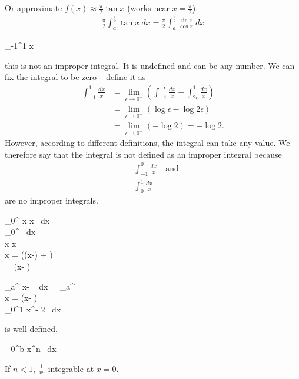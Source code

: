 \begin{nex}
 	Or approximate $f(x) \approx \frac \pi 2 \tan x$ (works near $x=\frac \pi 2$).
 	\begin{align*}
 	\frac \pi 2 \int_a^{\frac \pi 2} \tan x ~dx = \frac \pi 2 \int_a^{\frac \pi 2} \frac{\sin x}{\cos x} ~ dx
 	\end{align*}
 	\item
 	\begin{itemal}
 		\int_{-1}^1  x
 	\end{itemal}
 	this is not an improper integral. It is undefined and can be any number. We can fix the integral to be zero -- define it as
 	\begin{align*}
 	\int_{-1}^1 \frac{dx} x & = \lim_{\epsilon \to 0^+} \left( \int_{-1}^{-\epsilon} \frac{dx} x + \int_{2\epsilon}^1 \frac{dx} x\right) \\
 	& = \lim_{\epsilon \to 0^+} (\log \epsilon - \log 2\epsilon) \\
 	& = \lim_{\epsilon\to 0^+} (-\log 2) = -\log 2.
 	\end{align*}
 	However, according to different definitions, the integral can take any value. We therefore say that the integral is not defined as an improper integral because
 	\begin{align*}
 	& \int_{-1}^0 \frac{dx} x \quad \text{and} \\
 	& \int_0^1 \frac{dx} x
 	\end{align*}
 	are no improper integrals. 
 	\item
 	\begin{itemal}
 		\int_0^{\frac {}} \frac x {\cos x} ~dx \\
 		\int_0^{\frac {}}  ~dx \\
 		\frac x {\cos x}  \infty \\
 		 {\cos x} =  {\cos\left(\left(x-\frac {}\right) + \right)} \\
 		=  {\sin\left(x- \frac {}\right)} \\
 		\approx \frac{-1}{x-\frac \pi 2}
 	\end{itemal}
 	\item
 	\begin{itemal}
 		\int_a^{\frac {}}  {x-\frac {}} ~ dx = _a^{\frac {}} \\
		  {} \approx {} {\cos x} =  {\cos\left(x- \right)} \\
		 \int_0^1 x^{- 2} ~dx
 	\end{itemal}
 	is well defined.
 	\item
 	\begin{itemal}
 		\int_0^b  {x^n} ~dx
 	\end{itemal}
 	If $n<1$, $\frac 1 {x^n}$ integrable at $x=0$.
 \end{nex}
 
 
	
	



